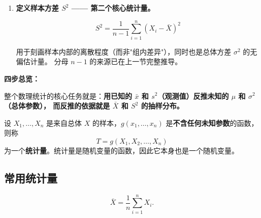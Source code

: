 \begin{enumerate}[label=\textbf{第 \arabic* 步}, leftmargin=*]
    这里没有"组"的概念——"组内均值"是 ANOVA 里的术语（多组比较时组内 vs. 组间）。
    在单样本场景下，它就是\emph{样本均值}。

    \item \textbf{定义样本方差 $S^2$ —— 第二个核心统计量。}

    \begin{equation}
        S^2 = \frac{1}{n-1} \sum_{i=1}^{n} (X_i - \bar{X})^2
    \end{equation}

    用于刻画样本内部的离散程度（而非"组内差异"），同时也是总体方差 $\sigma^2$ 的无偏估计量。
    分母 $n-1$ 的来源已在上一节完整推导。

\end{enumerate}

\textbf{四步总览：}

\begin{center}
\end{center}

整个数理统计的核心任务就是：\textbf{用已知的 $\bar{x}$ 和 $s^2$（观测值）反推未知的 $\mu$ 和 $\sigma^2$（总体参数），
而反推的依据就是 $\bar{X}$ 和 $S^2$ 的抽样分布。}

\begin{definition}[统计量]
设 $X_1, \dots, X_n$ 是来自总体 $X$ 的样本，$g(x_1, \dots, x_n)$ 是\textbf{不含任何未知参数}的函数，则称
\begin{equation}
    T = g(X_1, X_2, \dots, X_n)
\end{equation}
为一个\textbf{统计量}。统计量是随机变量的函数，因此它本身也是一个随机变量。
\end{definition}

\subsection{常用统计量}

\begin{definition}[样本均值]
\begin{equation}
    \bar{X} = \frac{1}{n} \sum_{i=1}^{n} X_i.
\end{equation}
\end{definition}

